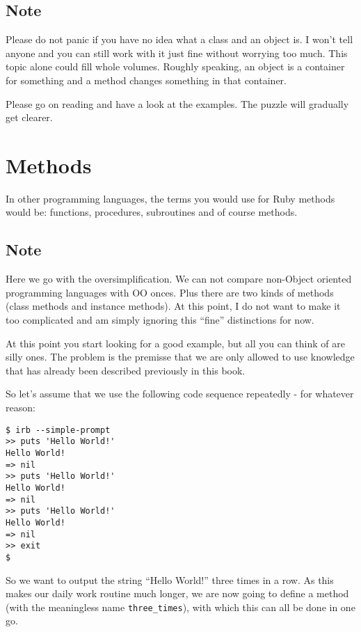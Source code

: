 \documentclass[a4paper]{book}
\begin{document}
\subsection{Note}\label{note-4}

Please do not panic if you have no idea what a class and an object is. I won't tell anyone and you can still work with it just fine without worrying too much. This topic alone could fill whole volumes. Roughly speaking, an object is a container for something and a method changes something in that container.

Please go on reading and have a look at the examples. The puzzle will gradually get clearer.

\section{Methods}\label{methods}

In other programming languages, the terms you would use for Ruby methods would be: functions, procedures, subroutines and of course methods.

\subsection{Note}\label{note-5}

Here we go with the oversimplification. We can not compare non-Object oriented programming languages with OO onces. Plus there are two kinds of methods (class methods and instance methods). At this point, I do not want to make it too complicated and am simply ignoring this “fine” distinctions for now.

At this point you start looking for a good example, but all you can think of are silly ones. The problem is the premisse that we are only allowed to use knowledge that has already been described previously in this book.

So let's assume that we use the following code sequence repeatedly - for whatever reason:

\begin{shaded}\begin{verbatim}
$ irb --simple-prompt
>> puts 'Hello World!'
Hello World!
=> nil
>> puts 'Hello World!'
Hello World!
=> nil
>> puts 'Hello World!'
Hello World!
=> nil
>> exit
$
\end{verbatim}\end{shaded}

So we want to output the string “Hello World!” three times in a row. As this makes our daily work routine much longer, we are now going to define a method (with the meaningless name \texttt{three\_times}), with which this can all be done in one go.
\end{document}
